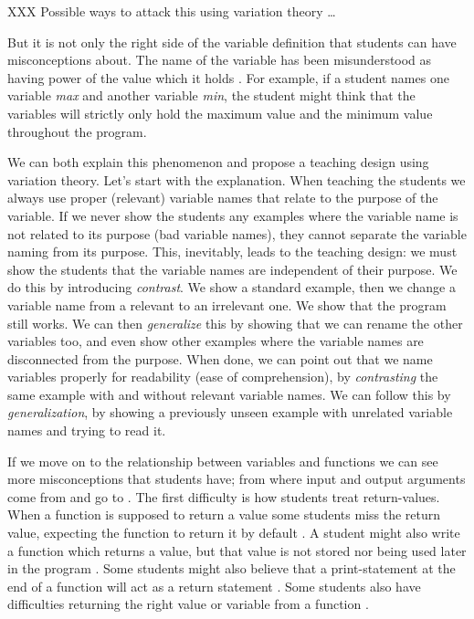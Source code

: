 XXX Possible ways to attack this using variation theory \dots

But it is not only the right side of the variable definition that students can 
have misconceptions about. The name of the variable has been misunderstood as 
having power of the value which it holds 
\parencite{MisconceptionsSurvey2017,Sleeman1984}. For example, if a student 
names one variable \emph{max} and another variable \emph{min}, the student 
might think that the variables will strictly only hold the maximum value and 
the minimum value throughout the program. 

We can both explain this phenomenon and propose a teaching design using 
variation theory.
Let's start with the explanation.
When teaching the students we always use proper (\ie relevant) variable names 
that relate to the purpose of the variable.
If we never show the students any examples where the variable name is not 
related to its purpose (bad variable names), they cannot separate the variable 
naming from its purpose.
This, inevitably, leads to the teaching design:
we must show the students that the variable names are independent of their 
purpose.
We do this by introducing \emph{contrast}.
We show a standard example, then we change a variable name from a relevant to 
an irrelevant one.
We show that the program still works.
We can then \emph{generalize} this by showing that we can rename the other 
variables too, and even show other examples where the variable names are 
disconnected from the purpose.
When done, we can point out that we name variables properly for readability 
(ease of comprehension), by \emph{contrasting} the same example with and 
without relevant variable names.
We can follow this by \emph{generalization}, by showing a previously unseen 
example with unrelated variable names and trying to read it.

If we move on to the relationship between variables and functions we can see 
more misconceptions that students have; from where input and output arguments 
come from and go to \parencite{Ragonis2005OOP}.
The first difficulty is how students treat return-values. When a function is 
supposed to return a value some students miss the return value, expecting the 
function to return it by default \parencite{Kurvinen2016,KumarVeerasamy2016}.
A student might also write a function which returns a value, but that value is 
not stored nor being used later in the program 
\parencite{AltadmriBrown2015}.
Some students might also believe that a print-statement at the end of a 
function will act as a return statement \parencite{MisconceptionsSurvey2017}. 
 Some students also have difficulties returning the right value or variable from a function 
\parencite{KumarVeerasamy2016}. 

